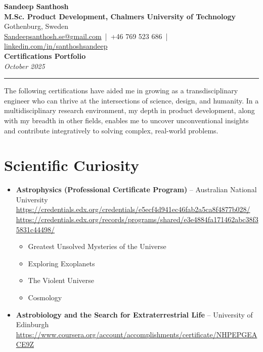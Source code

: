 \documentclass[11pt,a4paper]{article}
\begin{document}
\begin{center}
    {\Huge \textbf{Sandeep Santhosh}} \\[6pt]
    \textbf{M.Sc. Product Development, Chalmers University of Technology} \\[2pt]
    Gothenburg, Sweden \\[6pt]
    \href{mailto:Sandeepsanthosh.se@gmail.com}{Sandeepsanthosh.se@gmail.com} \,|\, 
    +46 769 523 686 \,|\, 
    \href{https://www.linkedin.com/in/santhoshsandeep}{linkedin.com/in/santhoshsandeep} \\[10pt]
    {\Large \textbf{Certifications Portfolio}} \\[2pt]
    \textit{October 2025}
\end{center}

\vspace{0.6cm}
\hrule
\vspace{0.8cm}

\begin{spacing}{0.5}
The following certifications have aided me in growing as a transdisciplinary engineer who can thrive at the intersections of science, design, and humanity. 
In a multidisciplinary research environment, my depth in product development, along with my breadth in other fields, enables me to uncover unconventional insights 
and contribute integratively to solving complex, real-world problems.
\end{spacing}



\section{Scientific Curiosity}
\begin{itemize}
    \item \textbf{Astrophysics (Professional Certificate Program)} – Australian National University\\
    \url{https://credentials.edx.org/credentials/e5ecf4d941ec46fab2a5ca8f4877b028/}\\
    \url{https://credentials.edx.org/records/programs/shared/e3e4884fa171462abc38f35831c44498/}
    \begin{itemize}
        \item Greatest Unsolved Mysteries of the Universe
        \item Exploring Exoplanets
        \item The Violent Universe
        \item Cosmology
    \end{itemize}

    \item \textbf{Astrobiology and the Search for Extraterrestrial Life} – University of Edinburgh\\
    \url{https://www.coursera.org/account/accomplishments/certificate/NHPEPGEACE9Z}
\end{itemize}
\end{document}

